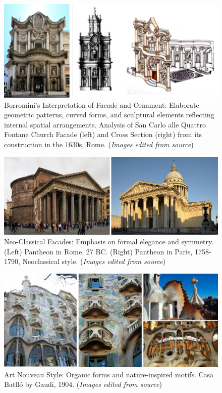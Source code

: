     \begin{figure}[htb]
    \centering
    \includegraphics[width= \linewidth]{Images/BaroquefacadeBorromini}
    \caption{Borromini's Interpretation of Facade and Ornament: Elaborate geometric patterns, curved forms, and sculptural elements reflecting internal spatial arrangements. Analysis of San Carlo alle Quattro Fontane Church Facade (left) and Cross Section (right) from its construction in the 1630s, Rome. (\textit{Images edited from source})}
    \label{fig:BorrominiArchitecture}
    \end{figure}

    \begin{figure}[htb]
    \centering
    \includegraphics[width= \linewidth]{Images/ClassicismNeoClassicism}
    \caption{Neo-Classical Facades: Emphasis on formal elegance and symmetry. (Left) Pantheon in Rome, 27 BC. (Right) Pantheon in Paris, 1758-1790, Neoclassical style. (\textit{Images edited from source})}
    \label{fig:ClassicismNeoClassicism}
    \end{figure}

    \begin{figure}[htb]
    \centering
    \includegraphics[width= \linewidth]{Images/ArtnouveauGaudi}
    \caption{Art Nouveau Style: Organic forms and nature-inspired motifs. Casa Batlló by Gaudi, 1904. (\textit{Images edited from source})}
    \label{fig:ArtNouveaustyle}
    \end{figure}

